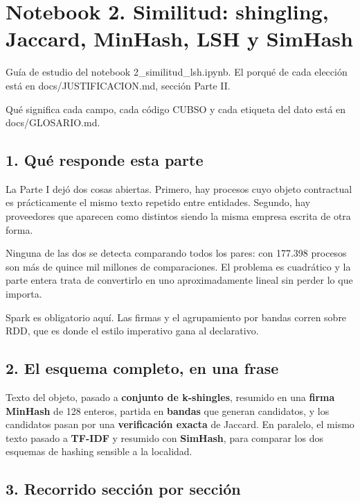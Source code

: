 \documentclass[11pt]{article}
\begin{document}
\clearpage
{}
\section*{Notebook 2. Similitud: shingling, Jaccard, MinHash, LSH y SimHash}
Guía de estudio del notebook 2\_\allowbreak{}similitud\_\allowbreak{}lsh.ipynb. El porqué de cada elección está en docs/JUSTIFICACION.md, sección Parte II.

Qué significa cada campo, cada código CUBSO y cada etiqueta del dato está en docs/GLOSARIO.md.

\subsection*{1. Qué responde esta parte}
La Parte I dejó dos cosas abiertas. Primero, hay procesos cuyo objeto contractual es prácticamente el mismo texto repetido entre entidades. Segundo, hay proveedores que aparecen como distintos siendo la misma empresa escrita de otra forma.

Ninguna de las dos se detecta comparando todos los pares: con 177.398 procesos son más de quince mil millones de comparaciones. El problema es cuadrático y la parte entera trata de convertirlo en uno aproximadamente lineal sin perder lo que importa.

Spark es obligatorio aquí. Las firmas y el agrupamiento por bandas corren sobre RDD, que es donde el estilo imperativo gana al declarativo.

\subsection*{2. El esquema completo, en una frase}
Texto del objeto, pasado a \textbf{conjunto de k-shingles}, resumido en una \textbf{firma MinHash} de 128 enteros, partida en \textbf{bandas} que generan candidatos, y los candidatos pasan por una \textbf{verificación exacta} de Jaccard. En paralelo, el mismo texto pasado a \textbf{TF-IDF} y resumido con \textbf{SimHash}, para comparar los dos esquemas de hashing sensible a la localidad.

\subsection*{3. Recorrido sección por sección}
\end{document}

